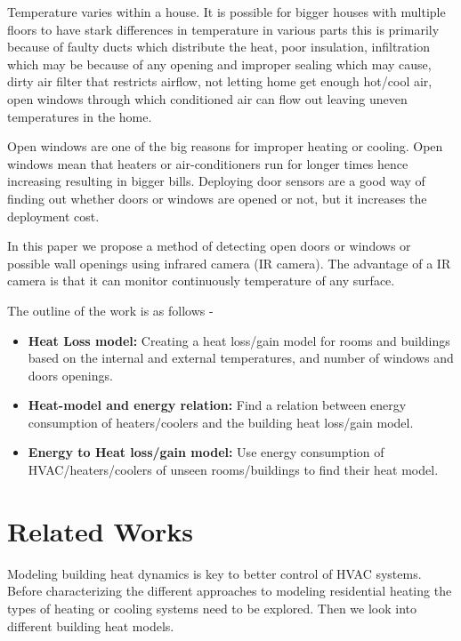 \documentclass{sig-alternate}
\begin{document}
 \indent Temperature varies within a house. It is possible for bigger houses with multiple floors to have stark differences in temperature in various parts this is primarily because of faulty ducts which distribute the heat, poor insulation, infiltration which may be because of any opening and improper sealing which may cause, dirty air filter that restricts airflow, not letting home get enough hot/cool air, open windows through which conditioned air can flow out leaving uneven temperatures in the home. 

\indent Open windows are one of the big reasons for improper heating or cooling. Open windows mean that heaters or air-conditioners run for longer times hence increasing resulting in bigger bills. Deploying door sensors are a good way of finding out whether doors or windows are opened or not, but it increases the deployment cost. 

\indent In this paper we propose a method of detecting open doors or windows or possible wall openings using infrared camera (IR camera). The advantage of a IR camera is that it can monitor continuously temperature of any surface.  
 
   \indent The outline of the work is as follows - 

\begin{itemize}

\item {\bf Heat Loss model:} Creating a heat loss/gain model for rooms and buildings based on the internal and external temperatures, and number of windows and doors openings.

\item {\bf Heat-model and energy relation:} Find a relation between energy consumption of heaters/coolers and the building heat loss/gain model. 

\item {\bf Energy to Heat loss/gain model:}  Use energy consumption of HVAC/heaters/coolers of unseen rooms/buildings to find their heat model. 

\end{itemize}


\section{Related Works}

 \indent Modeling building heat dynamics is key to better control of HVAC systems. Before characterizing the different approaches to modeling residential heating the types of heating or cooling systems need to be explored. Then we look into different building heat models.
 
\end{document}
